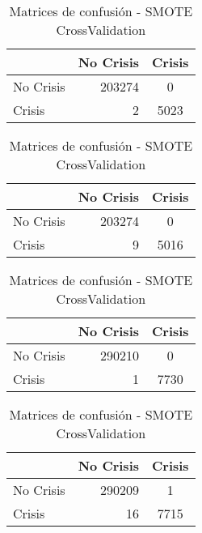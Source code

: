\begin{table}
    \begin{center}
        \begin{subtable}[c]{0.4\textwidth}
            \begin{tabular}{lrc}
                \hline
                 & No Crisis & Crisis \\
                \hline
                No Crisis & 203274  & 0 \\
                Crisis & 2 & 5023 \\
                \hline
            \end{tabular}
            \label{tab:mat-conf-rotfor-two-fold1}
        \end{subtable}
        \hspace{1em}\vspace{1em}
        \begin{subtable}[c]{0.4\textwidth}
            \begin{tabular}{lrc}
                \hline
                 & No Crisis & Crisis \\
                \hline
                No Crisis & 203274  & 0 \\
                Crisis & 9 & 5016\\
                \hline
            \end{tabular}
            \label{tab:mat-conf-rotfor-two-fold2}
        \end{subtable}
        \begin{subtable}[c]{0.4\textwidth}
            \begin{tabular}{lrc}
                \hline
                 & No Crisis & Crisis \\
                \hline
                No Crisis & 290210  & 0 \\
                Crisis & 1 & 7730\\
                \hline
            \end{tabular}
            \label{tab:mat-conf-rotfor-all-fold1}
        \end{subtable}
        \hspace{1em}\vspace{1em}
        \begin{subtable}[c]{0.4\textwidth}
            \begin{tabular}{lrc}
                \hline
                 & No Crisis & Crisis \\
                \hline
                No Crisis & 290209 & 1 \\
                Crisis & 16 & 7715\\
                \hline
            \end{tabular}
            \label{tab:mat-conf-rotfor-all-fold2}
        \end{subtable}
    \caption{Matrices de confusión - SMOTE CrossValidation}
    \label{tab:matriz-smote-cv}
    \end{center}
\end{table}
